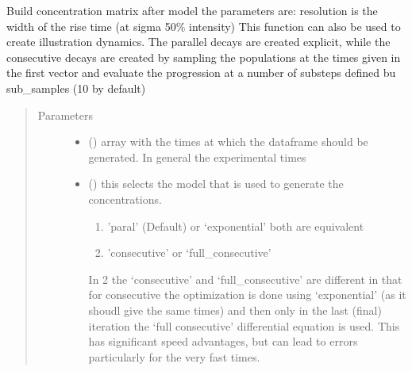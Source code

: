 \documentclass[letterpaper,10pt,english]{sphinxmanual}
\begin{document}
\begin{fulllineitems}
\label{\detokenize{plot_func:plot_func.build_c}}
Build concentration matrix after model the parameters are:
resolution is the width of the rise time (at sigma 50\% intensity)
This function can also be used to create illustration dynamics.
The parallel decays are created explicit, while the consecutive decays are
created by sampling the populations at the times given in the first vector and
evaluate the progression at a number of substeps defined bu sub\_samples (10 by default)
\begin{quote}\begin{description}
\item[{Parameters}] \leavevmode\begin{itemize}
\item {} 
 () \textendash{} array with the times at which the dataframe should be generated. In general the
experimental times

\item {} 
 (\sphinxstyleliteralemphasis{\sphinxupquote{, }}) \textendash{} 
this selects the model that is used to generate the concentrations.
\begin{enumerate}
%
\item {} 
’paral’ (Default) or ‘exponential’ both are equivalent

\item {} 
’consecutive’ or ‘full\_consecutive’

\end{enumerate}

In 2 the ‘consecutive’ and ‘full\_consecutive’ are different in that for consecutive
the optimization is done using ‘exponential’ (as it shoudl give the same times)
and then only in the last (final) iteration the ‘full consecutive’ differential
equation is used. This has significant speed advantages, but can lead to errors particularly
for the very fast times.



\end{itemize}
\end{description}
\end{quote}
\end{fulllineitems}
\end{document}
